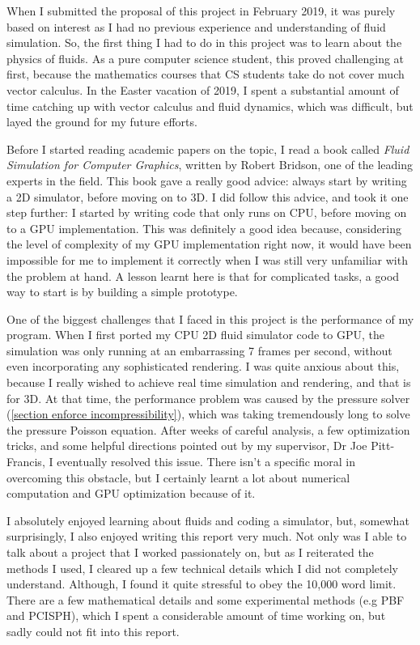 When I submitted the proposal of this project in February 2019, it was purely based on interest as I had no previous experience and understanding of fluid simulation. So, the first thing I had to do in this project was to learn about the physics of fluids. As a pure computer science student, this proved challenging at first, because the mathematics courses that CS students take do not cover much vector calculus. In the Easter vacation of 2019, I spent a substantial amount of time catching up with vector calculus and fluid dynamics, which was difficult, but layed the ground for my future efforts.

Before I started reading academic papers on the topic, I read a book called \textit{Fluid Simulation for Computer Graphics}\cite{bridson2015fluid}, written by Robert Bridson, one of the leading experts in the field. This book gave a really good advice: always start by writing a 2D simulator, before moving on to 3D. I did follow this advice, and took it one step further: I started by writing code that only runs on CPU, before moving on to a GPU implementation. This was definitely a good idea because, considering the level of complexity of my GPU implementation right now, it would have been impossible for me to implement it correctly when I was still very unfamiliar with the problem at hand. A lesson learnt here is that for complicated tasks, a good way to start is by building a simple prototype.

One of the biggest challenges that I faced in this project is the performance of my program. When I first ported my CPU 2D fluid simulator code to GPU, the simulation was only running at an embarrassing 7 frames per second, without even incorporating any sophisticated rendering. I was quite anxious about this, because I really wished to achieve real time simulation and rendering, and that is for 3D. At that time, the performance problem was caused by the pressure solver (\ref{section enforce incompressibility}), which was taking tremendously long to solve the pressure Poisson equation. After weeks of careful analysis, a few optimization tricks, and some helpful directions pointed out by my supervisor, Dr Joe Pitt-Francis, I eventually resolved this issue. There isn't a specific moral in overcoming this obstacle, but I certainly learnt a lot about numerical computation and GPU optimization because of it.

I absolutely enjoyed learning about fluids and coding a simulator, but, somewhat surprisingly, I also enjoyed writing this report very much. Not only was I able to talk about a project that I worked passionately on, but as I reiterated the methods I used, I cleared up a few technical details which I did not completely understand. Although, I found it quite stressful to obey the 10,000 word limit. There are a few mathematical details and some experimental methods (e.g PBF and PCISPH), which I spent a considerable amount of time working on, but sadly could not fit into this report.


